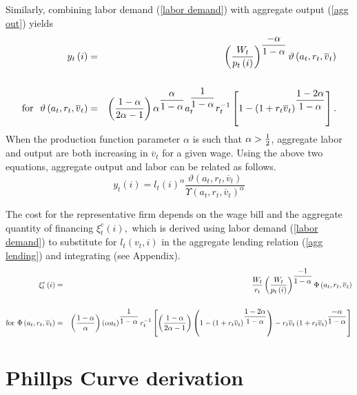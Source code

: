 \documentclass{article}
\begin{document}
Similarly, combining labor demand (\ref{labor demand}) with aggregate output
(\ref{agg out}) yields
\begin{eqnarray}
y_{t}\left( i\right) &=&\left( \frac{W_{t}}{p_{t}\left( i\right) }\right) ^{%
\dfrac{-\alpha }{1-\alpha }}\vartheta \left( a_{t},r_{t},\overline{v}%
_{t}\right)  \label{agg out sol} \\
&&  \notag \\
\text{for \ }\vartheta \left( a_{t},r_{t},\overline{v}_{t}\right) &=&\left(
\frac{1-\alpha }{2\alpha -1}\right) \alpha ^{\dfrac{\alpha }{1-\alpha }%
}a_{t}^{\dfrac{1}{1-\alpha }}r_{t}^{-1}\left[ 1-\left( 1+r_{t}\overline{v}%
_{t}\right) ^{\dfrac{1-2\alpha }{1-\alpha }}\right] .  \notag
\end{eqnarray}
When the production function parameter $\alpha$ is such that $\alpha >\frac{%
1}{2}$, aggregate labor and output are both increasing in $\overline{v}_{t}$
for a given wage. Using the above two equations, aggregate output and labor
can be related as follows.
\begin{equation}
y_{t}\left( i\right) =l_{t}\left( i\right) ^{\alpha }\frac{\vartheta \left(
a_{t},r_{t},\overline{v}_{t}\right) }{\Upsilon \left( a_{t},r_{t},\overline{v%
}_{t}\right) ^{\alpha }}  \label{agg prod}
\end{equation}

The cost for the representative firm depends on the wage bill and the
aggregate quantity of financing $\xi _{t}^{e}\left( i\right),$ which is
derived using labor demand (\ref{labor demand}) to substitute for $%
l_{t}\left( v_{t},i\right)$ in the aggregate lending relation (\ref{agg
lending}) and integrating (see Appendix).
\begin{eqnarray}
\xi _{t}^{e}\left( i\right) &=&\frac{W_{t}}{r_{t}}\left( \frac{W_{t}}{%
p_{t}\left( i\right) }\right) ^{\dfrac{-1}{1-\alpha }}\Phi \left(
a_{t},r_{t},\overline{v}_{t}\right)  \label{agg fin cost} \\
&&  \notag \\
\text{for }\Phi \left( a_{t},r_{t},\overline{v}_{t}\right) &=&\left( \frac{%
1-\alpha }{\alpha }\right) \left( \alpha a_{t}\right) ^{\dfrac{1}{1-\alpha }%
}r_{t}^{-1}\left[ \left( \frac{1-\alpha }{2\alpha -1}\right) \left( 1-\left(
1+r_{t}\overline{v}_{t}\right) ^{\dfrac{1-2\alpha }{1-\alpha }}\right) -r_{t}%
\overline{v}_{t}\left( 1+r_{t}\overline{v}_{t}\right) ^{\dfrac{-\alpha }{%
1-\alpha }}\right]  \notag
\end{eqnarray}

\section{Phillps Curve derivation}
\end{document}
